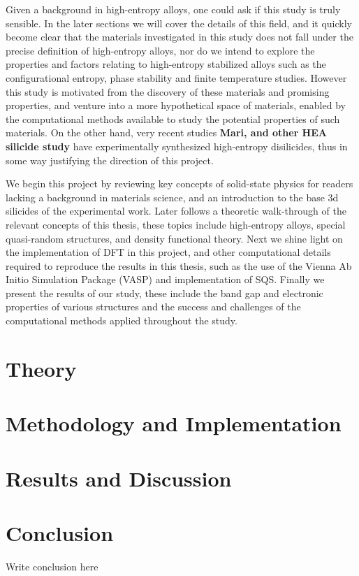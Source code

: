 \documentclass[UKenglish]{ifimaster}  %
\begin{document}
Given a background in high-entropy alloys, one could ask if this study is truly sensible. In the later sections we will cover the details of this field, and it quickly become clear that the materials investigated in this study does not fall under the precise definition of high-entropy alloys, nor do we intend to explore the properties and factors relating to high-entropy stabilized alloys such as the configurational entropy, phase stability and finite temperature studies. However this study is motivated from the discovery of these materials and promising properties, and venture into a more hypothetical space of materials, enabled by the computational methods available to study the potential properties of such materials. On the other hand, very recent studies \textbf{Mari, and other HEA silicide study} have experimentally synthesized high-entropy disilicides, thus in some way justifying the direction of this project. 

We begin this project by reviewing key concepts of solid-state physics for readers lacking a background in materials science, and an introduction to the base 3d silicides of the experimental work. Later follows a theoretic walk-through of the relevant concepts of this thesis, these topics include high-entropy alloys, special quasi-random structures, and density functional theory. Next we shine light on the implementation of DFT in this project, and other computational details required to reproduce the results in this thesis, such as the use of the Vienna Ab Initio Simulation Package (VASP) and implementation of SQS. Finally we present the results of our study, these include the band gap and electronic properties of various structures and the success and challenges of the computational methods applied throughout the study. 

\part{Theory}                    %





\part{Methodology and Implementation}


 
\part{Results and Discussion}





\part{Conclusion}
Write conclusion here

\appendix





\backmatter{}
\printbibliography
\end{document}

